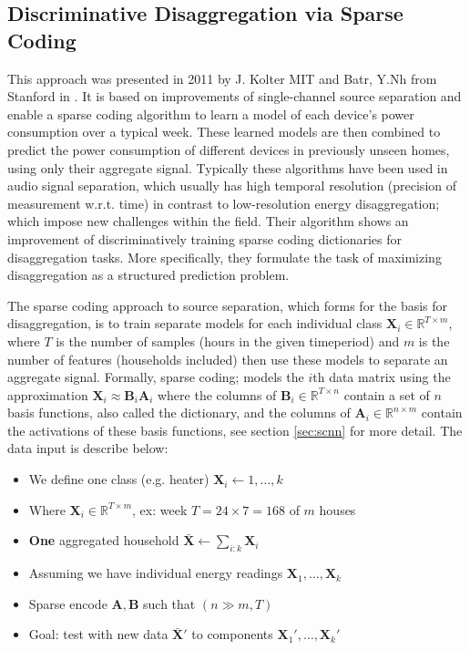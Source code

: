 \subsection{Discriminative Disaggregation via Sparse Coding}
\label{sec:ddsc}
This approach was presented in 2011 by J. Kolter MIT and Batr, Y.Nh from Stanford in \cite{DDSC}. It is based on improvements of single-channel source separation and enable a sparse coding algorithm to learn a model of each device's power consumption over a typical week. These learned models are then combined to predict the power consumption of different devices in previously unseen homes, using only their aggregate signal. Typically these algorithms have been used in audio signal separation, which usually has high temporal resolution (precision of measurement w.r.t. time) in contrast to low-resolution energy disaggregation; which impose new challenges within the field. Their algorithm shows an improvement of discriminatively training sparse coding dictionaries for disaggregation tasks. More specifically, they formulate the task of maximizing disaggregation as a structured prediction problem. 

The sparse coding approach to source separation, which forms for the basis for disaggregation, is to train separate models for each individual class $\mathbf{X}_i \in \mathbb{R}^{T\times m}$, where $T$ is the number of samples (hours in the given timeperiod) and $m$ is the number of features (households included) then use these models to separate an aggregate signal. Formally, sparse coding; models the $i$th data matrix using the approximation $\mathbf{X}_i \approx \mathbf{B}_i\mathbf{A}_i$ where the columns of $\mathbf{B}_i \in \mathbb{R}^{T \times n}$ contain a set of $n$ basis functions, also called the dictionary, and the columns of $\mathbf{A}_i \in \mathbb{R}^{n \times m}$ contain the activations of these basis functions, see section \ref{sec:scnn} for more detail. The data input is describe below:

\begin{itemize}
	\item{We define one class (e.g. heater) $\mathbf{X}_i \leftarrow 1,\dots,
		k$}
	\item{Where $\mathbf{X}_i \in \mathbb{R}^{T \times m}$, ex: week $T=24\times7=168$ of $m$ houses}
	\item{\textbf{One} aggregated household $\bar{\mathbf{X}} \leftarrow \sum_{i:k} \mathbf{X}_i$}
	\item{Assuming we have individual energy readings $\mathbf{X}_1,\dots,\mathbf{X}_k$}
	\item{Sparse encode $\mathbf{A},\mathbf{B}$ such that $(n \gg m,T)$}
	\item{Goal: test with new data $\bar{\mathbf{X}}'$ to components
		$\mathbf{X}_1',\dots,\mathbf{X}_k'$}
\end{itemize}

